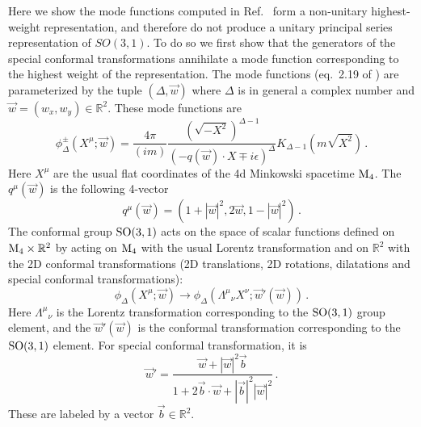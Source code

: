 \documentclass{brownthesis}
\begin{document}
Here we show the mode functions computed in Ref.~\cite{Pasterski:2017kqt}
form a non-unitary highest-weight representation, and therefore do
not produce a unitary principal series representation of $SO(3,1)$.
To do so we first show that the generators of the special conformal
transformations annihilate a mode function corresponding to the highest
weight of the representation. The mode functions (eq.~2.19 of \cite{Pasterski:2017kqt})
are parameterized by the tuple $(\Delta,\vec{w})$ where $\Delta$
is in general a complex number and $\vec{w}=(w_{x},w_{y})\in\mathbb{R}^{2}$.
These mode functions are
\begin{equation}
\phi_{\Delta}^{\pm}(X^{\mu};\vec{w})=\frac{4\pi}{(im)}\frac{(\sqrt{-X^{2}})^{\Delta-1}}{(-q(\vec{w})\cdot X\mp i\epsilon)^{\Delta}}K_{\Delta-1}(m\sqrt{X^{2}})\,.\label{eq:psmode}
\end{equation}
Here $X^{\mu}$ are the usual flat coordinates of the 4d Minkowski
spacetime ${\rm M_{4}}$. The $q^{\mu}(\vec{w})$ is the following
4-vector
\[
q^{\mu}(\vec{w})=(1+|\vec{w}|^{2},2\vec{w},1-|\vec{w}|^{2})\,.
\]
The conformal group ${\rm SO(3,1)}$ acts on the space of scalar functions
defined on ${\rm M_{4}\times\mathbb{R}^{2}}$ by acting on ${\rm M_{4}}$
with the usual Lorentz transformation and on $\mathbb{R}^{2}$ with
the 2D conformal transformations (2D translations, 2D rotations, dilatations
and special conformal transformations):
\[
\phi_{\Delta}(X^{\mu};\vec{w})\to\phi_{\Delta}(\Lambda^{\mu}{}_{\nu}X^{\nu};\vec{w}'(\vec{w}))\,.
\]
Here $\Lambda^{\mu}{}_{\nu}$ is the Lorentz transformation corresponding
to the ${\rm SO(3,1)}$ group element, and the $\vec{w}'(\vec{w})$
is the conformal transformation corresponding to the ${\rm SO(3,1)}$
element. For special conformal transformation, it is
\[
\vec{w}'=\frac{\vec{w}+|\vec{w}|^{2}\vec{b}}{1+2\vec{b}\cdot\vec{w}+|\vec{b}|^{2}|\vec{w}|^{2}}\,.
\]
These are labeled by a vector $\vec{b}\in\mathbb{R}^{2}$.
\end{document}
